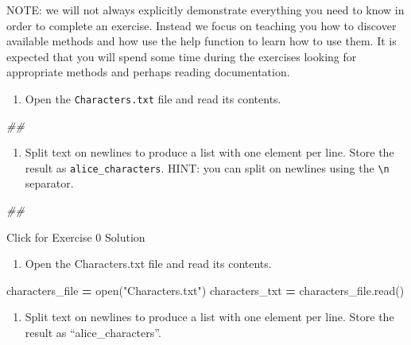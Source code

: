 \documentclass[]{book}
\newenvironment{Shaded}{\begin{snugshade}}{\end{snugshade}}
\newcommand{\BuiltInTok}[1]{#1}
\newcommand{\CommentTok}[1]{\textcolor[rgb]{0.56,0.35,0.01}{\textit{#1}}}
\newcommand{\NormalTok}[1]{#1}
\newcommand{\OperatorTok}[1]{\textcolor[rgb]{0.81,0.36,0.00}{\textbf{#1}}}
\newcommand{\StringTok}[1]{\textcolor[rgb]{0.31,0.60,0.02}{#1}}
\providecommand{\tightlist}{%
  \setlength{\itemsep}{0pt}\setlength{\parskip}{0pt}}
\begin{document}
NOTE: we will not always explicitly demonstrate everything you need to know in order to complete an exercise. Instead we focus on teaching you how to discover available methods and how use the help function to learn how to use them. It is expected that you will spend some time during the exercises looking for appropriate methods and perhaps reading documentation.

\begin{enumerate}
\def\labelenumi{\arabic{enumi}.}
\tightlist
\item
  Open the \texttt{Characters.txt} file and read its contents.
\end{enumerate}

\begin{Shaded}
\begin{Highlighting}[]
\CommentTok{##}
\end{Highlighting}
\end{Shaded}

\begin{enumerate}
\def\labelenumi{\arabic{enumi}.}
\setcounter{enumi}{1}
\tightlist
\item
  Split text on newlines to produce a list with one element per line. Store the result as \texttt{alice\_characters}. HINT: you can split on newlines using the \texttt{\textbackslash{}n} separator.
\end{enumerate}

\begin{Shaded}
\begin{Highlighting}[]
\CommentTok{##}
\end{Highlighting}
\end{Shaded}

{Click for Exercise 0 Solution}

\begin{enumerate}
\def\labelenumi{\arabic{enumi}.}
\tightlist
\item
  Open the Characters.txt file and read its contents.
\end{enumerate}

\begin{Shaded}
\begin{Highlighting}[]
\NormalTok{characters_file }\OperatorTok{=} \BuiltInTok{open}\NormalTok{(}\StringTok{"Characters.txt"}\NormalTok{)}
\NormalTok{characters_txt }\OperatorTok{=}\NormalTok{ characters_file.read()}
\end{Highlighting}
\end{Shaded}

\begin{enumerate}
\def\labelenumi{\arabic{enumi}.}
\setcounter{enumi}{1}
\tightlist
\item
  Split text on newlines to produce a list with one element per line.
  Store the result as ``alice\_characters''.
\end{enumerate}
\end{document}
